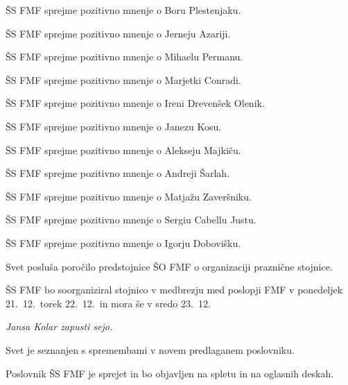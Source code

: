 \documentclass{seja}
\begin{document}
\begin{ad}
\begin{sklep*}
  ŠS FMF sprejme pozitivno mnenje o Boru Plestenjaku.
\end{sklep*}
\begin{sklep*}
  ŠS FMF sprejme pozitivno mnenje o Jerneju Azariji.
\end{sklep*}
\begin{sklep*}
  ŠS FMF sprejme pozitivno mnenje o Mihaelu Permanu.
\end{sklep*}
\begin{sklep*}
  ŠS FMF sprejme pozitivno mnenje o Marjetki Conradi.
\end{sklep*}
\begin{sklep*}
  ŠS FMF sprejme pozitivno mnenje o Ireni Drevenšek Olenik.
\end{sklep*}
\begin{sklep*}
  ŠS FMF sprejme pozitivno mnenje o Janezu Kosu.
\end{sklep*}
\begin{sklep*}
  ŠS FMF sprejme pozitivno mnenje o Alekseju Majkiču.
\end{sklep*}
\begin{sklep*}
  ŠS FMF sprejme pozitivno mnenje o Andreji Šarlah.
\end{sklep*}
\begin{sklep*}
  ŠS FMF sprejme pozitivno mnenje o Matjažu Zaveršniku.
\end{sklep*}
\begin{sklep*}
  ŠS FMF sprejme pozitivno mnenje o Sergiu Cabellu Justu.
\end{sklep*}
\begin{sklep*}
  ŠS FMF sprejme pozitivno mnenje o Igorju Dobovišku.
\end{sklep*}

\item Svet posluša poročilo predstojnice ŠO FMF o organizaciji praznične stojnice.

\begin{sklep*}
  ŠS FMF bo soorganiziral stojnico v medbrezju med poslopji FMF v ponedeljek
  21.\ 12.\, torek 22.\ 12.\ in mora še v sredo 23.\ 12.
\end{sklep*}

\textit{Jansa Kolar zapusti sejo.}

\item Svet je seznanjen s spremembami v novem predlaganem poslovniku.

\begin{sklep*}
  Poslovnik ŠS FMF je sprejet in bo objavljen na spletu in na oglasnih deskah.
\end{sklep*}
\end{ad}
\end{document}
